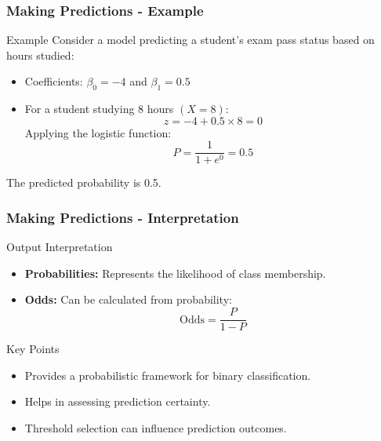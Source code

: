 \documentclass[aspectratio=169]{beamer}
\begin{document}
\begin{frame}[fragile]
  \frametitle{Making Predictions - Example}
  
  \begin{exampleblock}{Example}
    Consider a model predicting a student's exam pass status based on hours studied:
    \begin{itemize}
      \item Coefficients: \(\beta_0 = -4\) and \(\beta_1 = 0.5\)
      \item For a student studying 8 hours \( (X = 8) \):
        \begin{equation}
          z = -4 + 0.5 \times 8 = 0
        \end{equation}
        Applying the logistic function:
        \begin{equation}
          P = \frac{1}{1 + e^{0}} = 0.5
        \end{equation}
    \end{itemize}
    The predicted probability is 0.5.
  \end{exampleblock}

\end{frame}

\begin{frame}[fragile]
  \frametitle{Making Predictions - Interpretation}
  
  \begin{block}{Output Interpretation}
    \begin{itemize}
      \item \textbf{Probabilities:} Represents the likelihood of class membership.
      \item \textbf{Odds:} Can be calculated from probability:
        \begin{equation}
          \text{Odds} = \frac{P}{1-P}
        \end{equation}
    \end{itemize}
  \end{block}
  
  \begin{block}{Key Points}
    \begin{itemize}
      \item Provides a probabilistic framework for binary classification.
      \item Helps in assessing prediction certainty.
      \item Threshold selection can influence prediction outcomes.
    \end{itemize}
  \end{block}

\end{frame}
\end{document}
